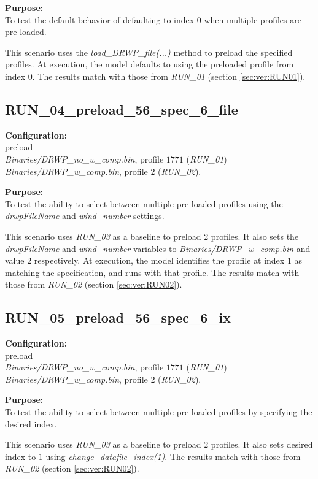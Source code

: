 \documentclass[11pt,fleqn]{report}
\begin{document}
\textbf{Purpose:}\\ To test the default behavior of defaulting to index 0 when
multiple profiles are pre-loaded.

This scenario uses the \textit{load\_DRWP\_file(...)} method 
to preload the specified
profiles. At execution, the model defaults to using the preloaded profile from
index 0. The results match with those from \textit{RUN\_01} (section
\ref{sec:ver:RUN01}).


\subsection{RUN\_04\_preload\_56\_spec\_6\_file}
\textbf{Configuration:}\\ preload\\
\textit{Binaries/DRWP\_no\_w\_comp.bin}, profile $1771$ (\textit{RUN\_01})
\textit{Binaries/DRWP\_w\_comp.bin}, profile $2$ (\textit{RUN\_02}).

\textbf{Purpose:}\\ To test the ability to select between multiple pre-loaded
profiles using the \textit{drwpFileName} and \textit{wind\_number} settings.

This scenario uses \textit{RUN\_03} as a baseline to preload 2 profiles.
It also sets the \textit{drwpFileName} and \textit{wind\_number}
variables to \textit{Binaries/DRWP\_w\_comp.bin} and value $2$ respectively.
At execution, the model identifies the profile at index 1 as matching the
specification, and runs with that profile.
The results match with those from \textit{RUN\_02} (section
\ref{sec:ver:RUN02}).


\subsection{RUN\_05\_preload\_56\_spec\_6\_ix}
\textbf{Configuration:}\\ preload\\
\textit{Binaries/DRWP\_no\_w\_comp.bin}, profile $1771$ (\textit{RUN\_01})
\textit{Binaries/DRWP\_w\_comp.bin}, profile $2$ (\textit{RUN\_02}).

\textbf{Purpose:}\\ To test the ability to select between multiple pre-loaded
profiles by specifying the desired index.

This scenario uses \textit{RUN\_03} as a baseline to preload 2 profiles.
It also sets desired index to $1$ using \textit{change\_datafile\_index(1)}.
The results match with those from \textit{RUN\_02} (section
\ref{sec:ver:RUN02}).
\end{document}
